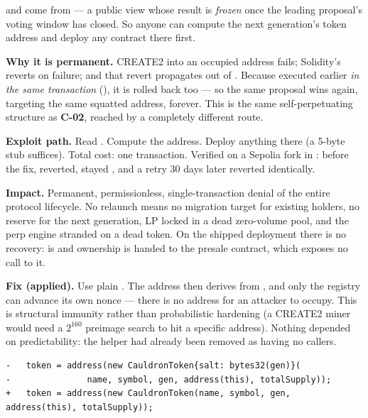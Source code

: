 \noindent and  come from  --- a
public view whose result is \emph{frozen} once the leading proposal's voting
window has closed. So anyone can compute the next generation's token address and
deploy any contract there first.

\textbf{Why it is permanent.} CREATE2 into an occupied address fails; Solidity's
 reverts on failure; and that revert propagates out of
. Because  executed earlier
\emph{in the same transaction} (), it is rolled
back too --- so the same proposal wins again, targeting the same squatted
address, forever. This is the same self-perpetuating structure as \textbf{C-02},
reached by a completely different route.

\textbf{Exploit path.} Read . Compute the address. Deploy
anything there (a 5-byte stub suffices). Total cost: one transaction. Verified
on a Sepolia fork in : before the fix,
 reverted,  stayed , and a
retry 30 days later reverted identically.

\textbf{Impact.} Permanent, permissionless, single-transaction denial of the
entire protocol lifecycle. No relaunch means no migration target for existing
holders, no reserve for the next generation, LP locked in a dead zero-volume
pool, and the perp engine stranded on a dead token. On the shipped deployment
there is no recovery:  is  and ownership is
handed to the presale contract, which exposes no call to it.

\textbf{Fix (applied).} Use plain . The address then derives from
, and only the registry can advance its own
nonce --- there is no address for an attacker to occupy. This is structural
immunity rather than probabilistic hardening (a CREATE2 miner would need a
$2^{160}$ preimage search to hit a specific address). Nothing depended on
predictability: the  helper had already been removed as
having no callers.

\begin{lstlisting}[numbers=none]
-   token = address(new CauldronToken{salt: bytes32(gen)}(
-               name, symbol, gen, address(this), totalSupply));
+   token = address(new CauldronToken(name, symbol, gen, address(this), totalSupply));
\end{lstlisting}

